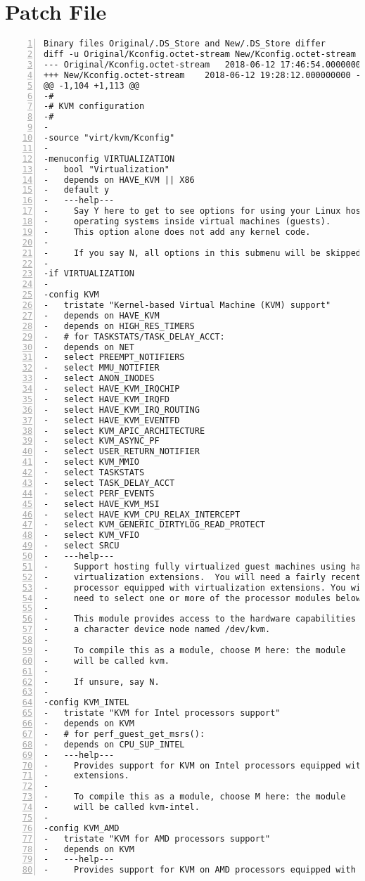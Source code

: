 \documentclass[10pt,draftclsnofoot,journal,compsoc,onecolumn]{IEEEtran}
\begin{document}
\section{Patch File}
\begin{lstlisting}[numbers=left]
Binary files Original/.DS_Store and New/.DS_Store differ
diff -u Original/Kconfig.octet-stream New/Kconfig.octet-stream
--- Original/Kconfig.octet-stream	2018-06-12 17:46:54.000000000 -0700
+++ New/Kconfig.octet-stream	2018-06-12 19:28:12.000000000 -0700
@@ -1,104 +1,113 @@
-#
-# KVM configuration
-#
-
-source "virt/kvm/Kconfig"
-
-menuconfig VIRTUALIZATION
-	bool "Virtualization"
-	depends on HAVE_KVM || X86
-	default y
-	---help---
-	  Say Y here to get to see options for using your Linux host to run other
-	  operating systems inside virtual machines (guests).
-	  This option alone does not add any kernel code.
-
-	  If you say N, all options in this submenu will be skipped and disabled.
-
-if VIRTUALIZATION
-
-config KVM
-	tristate "Kernel-based Virtual Machine (KVM) support"
-	depends on HAVE_KVM
-	depends on HIGH_RES_TIMERS
-	# for TASKSTATS/TASK_DELAY_ACCT:
-	depends on NET
-	select PREEMPT_NOTIFIERS
-	select MMU_NOTIFIER
-	select ANON_INODES
-	select HAVE_KVM_IRQCHIP
-	select HAVE_KVM_IRQFD
-	select HAVE_KVM_IRQ_ROUTING
-	select HAVE_KVM_EVENTFD
-	select KVM_APIC_ARCHITECTURE
-	select KVM_ASYNC_PF
-	select USER_RETURN_NOTIFIER
-	select KVM_MMIO
-	select TASKSTATS
-	select TASK_DELAY_ACCT
-	select PERF_EVENTS
-	select HAVE_KVM_MSI
-	select HAVE_KVM_CPU_RELAX_INTERCEPT
-	select KVM_GENERIC_DIRTYLOG_READ_PROTECT
-	select KVM_VFIO
-	select SRCU
-	---help---
-	  Support hosting fully virtualized guest machines using hardware
-	  virtualization extensions.  You will need a fairly recent
-	  processor equipped with virtualization extensions. You will also
-	  need to select one or more of the processor modules below.
-
-	  This module provides access to the hardware capabilities through
-	  a character device node named /dev/kvm.
-
-	  To compile this as a module, choose M here: the module
-	  will be called kvm.
-
-	  If unsure, say N.
-
-config KVM_INTEL
-	tristate "KVM for Intel processors support"
-	depends on KVM
-	# for perf_guest_get_msrs():
-	depends on CPU_SUP_INTEL
-	---help---
-	  Provides support for KVM on Intel processors equipped with the VT
-	  extensions.
-
-	  To compile this as a module, choose M here: the module
-	  will be called kvm-intel.
-
-config KVM_AMD
-	tristate "KVM for AMD processors support"
-	depends on KVM
-	---help---
-	  Provides support for KVM on AMD processors equipped with the AMD-V

\end{lstlisting}
\end{document}
